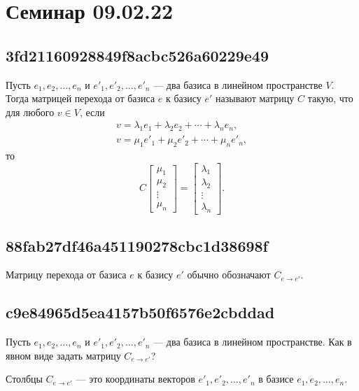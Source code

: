\documentclass[11pt, a5paper]{article}
\newenvironment{note}[1]{\goodbreak\par\subsection{\hfill \color{lightgray}\tiny #1}}{}
\newenvironment{cloze}[2][\ldots]{\begin{leftbar}}{\end{leftbar}}
\newenvironment{icloze}[2][\ldots]{%
  \ignorespaces\text{\tiny \color{lightgray} \{\{c#2:: }%
}{%
  \text{\tiny \color{lightgray}\}\}}\unskip%
}
\begin{document}
\pagebreak

\section{Семинар 09.02.22}
\begin{note}{3fd21160928849f8acbc526a60229e49}
    Пусть \( e_1, e_2, \ldots, e_n \) и \( e'_1, e'_2, \ldots, e'_n \) --- два базиса в линейном пространстве \( V \).
    Тогда \begin{icloze}{2}матрицей перехода от базиса \( e \) к базису \( e' \)\end{icloze} называют
    \begin{icloze}{1}матрицу \( C \) такую, что для любого \( v \in V \), если
    \[
        \begin{gathered}
            v = \lambda_1 e_1 + \lambda_2 e_2 + \cdots + \lambda_n e_n, \\
            v = \mu_1 e'_1 + \mu_2 e'_2 + \cdots + \mu_n e'_n,
        \end{gathered}
    \]
    то
    \[
        C \begin{bmatrix}
            \mu_1 \\ \mu_2 \\ \vdots \\ \mu_n
        \end{bmatrix}
        =
        \begin{bmatrix}
            \lambda_1 \\ \lambda_2 \\ \vdots \\ \lambda_n
        \end{bmatrix}.
    \]
\end{icloze}
\end{note}

\begin{note}{88fab27df46a451190278cbc1d38698f}
    \begin{icloze}{2}Матрицу перехода от базиса \( e \) к базису \( e' \)\end{icloze} обычно обозначают \begin{icloze}{1}\( C_{e \to e'}  \).\end{icloze}
\end{note}

\begin{note}{c9e84965d5ea4157b50f6576e2cbddad}
    Пусть \( e_1, e_2, \ldots, e_n \) и \( e'_1, e'_2, \ldots, e'_n \) --- два базиса в линейном пространстве.
    Как в явном виде задать матрицу \( C_{e \to e'} \)?

    \begin{cloze}{1}
        Столбцы \( C_{e \to e'} \) --- это координаты векторов \( e'_1, e'_2, \ldots, e'_n \) в базисе \( e_1, e_2, \ldots, e_n \).
    \end{cloze}
\end{note}
\end{document}
